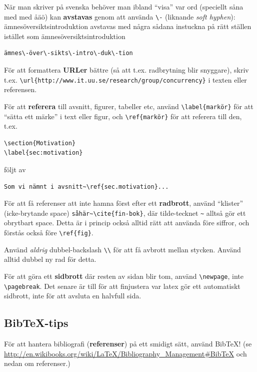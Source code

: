 \documentclass[swedish, a4paper,12pt]{article}
\begin{document}
När man skriver på svenska behöver man ibland ``visa'' var ord (speciellt såna med med åäö) kan \textbf{avstavas} genom att använda \verb|\-| (liknande \textit{soft hyphen}): ämnesöversiktsintroduktion avstavas med några sådana instuckna på rätt ställen istället som ämnes\-över\-sikts\-intro\-duk\-tion

\begin{verbatim}
ämnes\-över\-sikts\-intro\-duk\-tion
\end{verbatim}

För att formattera \textbf{URLer} bättre (så att t.ex. radbrytning blir snyggare), skriv t.ex. \verb|\url{http://www.it.uu.se/research/group/concurrency}| i texten eller referensen.

För att \textbf{referera} till avsnitt, figurer, tabeller etc, använd \verb|\label{markör}| för att ``sätta ett märke'' i text eller figur, och \verb|\ref{markör}| för att referera till den, t.ex.
\begin{verbatim}
\section{Motivation}
\label{sec:motivation}
\end{verbatim}

följt av
\begin{verbatim}
Som vi nämnt i avsnitt~\ref{sec.motivation}...
\end{verbatim}

För att få referenser att inte hamna först efter ett \textbf{radbrott}, använd ``klister'' (icke-brytande space) \verb|såhär~\cite{fin-bok}|, där tilde-tecknet \verb|~| alltså gör ett obrytbart space. Detta är i princip också alltid rätt att använda före siffror, och förstås också före \verb|\ref{fig}|.

Använd \emph{aldrig} dubbel-backslash \verb|\\| för att få avbrott mellan stycken. Använd alltid dubbel ny rad för detta.

För att göra ett \textbf{sidbrott} där resten av sidan blir tom, använd \verb|\newpage|, inte \verb|\pagebreak|. Det senare är till för att finjustera var latex gör ett automatiskt sidbrott, inte för att avsluta en halvfull sida.

\subsection{Bib\TeX-tips}

För att hantera bibliografi (\textbf{referenser}) på ett smidigt sätt, använd BibTeX! (se \url{http://en.wikibooks.org/wiki/LaTeX/Bibliography_Management#BibTeX} och nedan om referenser.)
\end{document}
